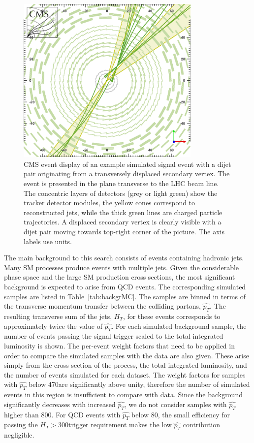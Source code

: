 \begin{figure}[htbp]
\centering
 \includegraphics[width=0.8\textwidth]{plots/eventDisplay.png}
\caption{CMS event display of an example simulated signal event with a dijet pair originating from a transversely displaced secondary vertex.
The event is presented in the plane transverse to the LHC beam line.
The concentric layers of detectors (grey or light green) show the tracker detector modules, the
yellow cones correspond to reconstructed jets, while the thick green lines are charged particle
trajectories. A displaced secondary vertex is clearly visible with a dijet pair moving towards
top-right corner of the picture.
The axis labels use \cm units. \label{fig:eventDisplay}}
\end{figure}


The main background to this search consists of events containing hadronic jets. Many SM processes
produce events with multiple jets. Given the considerable phase space and the large SM production 
cross sections,
 the most significant background 
is expected to arise from QCD events. The corresponding simulated samples
are listed in Table~\ref{tab:backgrMC}. The samples are binned in terms
of the transverse momentum transfer between the colliding partons, $\hat{p_T}$.
The resulting transverse sum
of the jets, $H_T$, for these events corresponds to approximately twice the value of $\hat{p_T}$. 
For each simulated background sample, the number of events passing the signal trigger
scaled to the total integrated luminosity is shown. The per-event weight factors that need 
to be applied in order to compare the simulated samples with the data are also given. These
arise simply from the cross section of the process, the total integrated luminosity, and the number
of events simulated for each dataset.
The weight factors for samples with $\hat{p_T}$
below 470\GeV are significantly above unity, therefore the number of simulated events in this region is insufficient to compare with data.
Since the background significantly decreases with increased $\hat{p_T}$, we do not consider samples with $\hat{p_T}$ higher
than 800\GeV. For QCD events with $\hat{p_T}$ below 80\GeV, the small efficiency for  passing the $H_T>$300\GeV trigger requirement
makes the low $\hat{p_T}$ contribution negligible.

